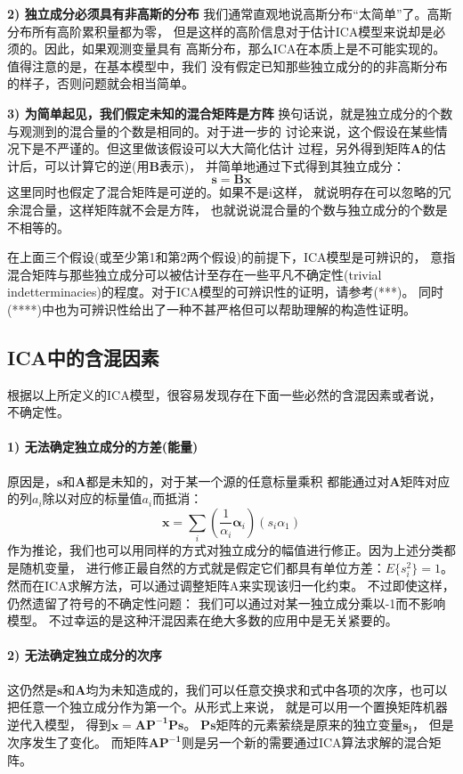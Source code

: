 \textbf{2) 独立成分必须具有非高斯的分布}
我们通常直观地说高斯分布“太简单”了。高斯分布所有高阶累积量都为零，
但是这样的高阶信息对于估计ICA模型来说却是必须的。因此，如果观测变量具有
高斯分布，那么ICA在本质上是不可能实现的。值得注意的是，在基本模型中，我们
没有假定已知那些独立成分的的非高斯分布的样子，否则问题就会相当简单。

\textbf{3) 为简单起见，我们假定未知的混合矩阵是方阵}
换句话说，就是独立成分的个数与观测到的混合量的个数是相同的。对于进一步的
讨论来说，这个假设在某些情况下是不严谨的。但这里做该假设可以大大简化估计
过程，另外得到矩阵$\bm{A}$的估计后，可以计算它的逆(用$\bm{B}$表示)，
并简单地通过下式得到其独立成分：
\begin{equation}
\bm{s}=\bm{B}\bm{x}
\end{equation}
这里同时也假定了混合矩阵是可逆的。如果不是i这样，
就说明存在可以忽略的冗余混合量，这样矩阵就不会是方阵，
也就说说混合量的个数与独立成分的个数是不相等的。

在上面三个假设(或至少第1和第2两个假设)的前提下，ICA模型是可辨识的，
意指混合矩阵与那些独立成分可以被估计至存在一些平凡不确定性(trivial indetterminacies)的程度。对于ICA模型的可辨识性的证明，请参考(***)。
同时(****)中也为可辨识性给出了一种不甚严格但可以帮助理解的构造性证明。
      
\subsection{ICA中的含混因素}
根据以上所定义的ICA模型，很容易发现存在下面一些必然的含混因素或者说，
不确定性。
\paragraph*{1) 无法确定独立成分的方差(能量)}
原因是，$\bm{s}$和$\bm{A}$都是未知的，对于某一个源的任意标量乘积
都能通过对$\bm{A}$矩阵对应的列$a_i$除以对应的标量值$a_i$而抵消：
\begin{equation}
\bm{x}=\sum_{i} (\frac{1}{{\alpha}_i} \bm{\alpha}_i)(s_i {\alpha}_1)
\end{equation}
作为推论，我们也可以用同样的方式对独立成分的幅值进行修正。因为上述分类都是随机变量，
进行修正最自然的方式就是假定它们都具有单位方差：$E\{s_i^2\}=1$。
然而在ICA求解方法，可以通过调整矩阵A来实现该归一化约束。
不过即使这样，仍然遗留了符号的不确定性问题：
我们可以通过对某一独立成分乘以-1而不影响模型。
不过幸运的是这种汗混因素在绝大多数的应用中是无关紧要的。

\paragraph*{2) 无法确定独立成分的次序}
这仍然是$\bm{s}$和$\bm{A}$均为未知造成的，我们可以任意交换求和式中各项的次序，也可以把任意一个独立成分作为第一个。从形式上来说，
就是可以用一个置换矩阵机器逆代入模型，
得到$\bm{x=AP^{-1}Ps}$。
$\bm{Ps}$矩阵的元素萦绕是原来的独立变量$\bm{s_j}$，
但是次序发生了变化。
而矩阵$\bm{AP^{-1}}$则是另一个新的需要通过ICA算法求解的混合矩阵。
 
